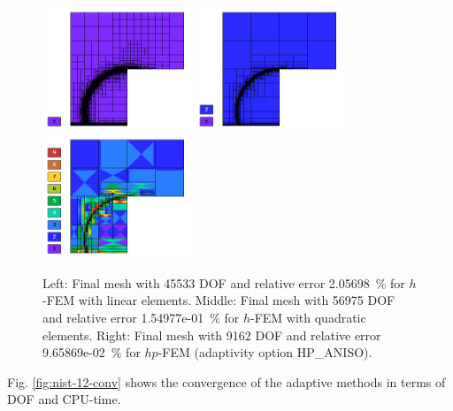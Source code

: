 \documentclass[12pt]{elsarticle}
\begin{document}
\begin{figure}[H]
\centering
\vspace{-3mm}
\includegraphics[height=3.7cm]{nist/nist-12/mesh_h1_aniso.png}
\includegraphics[height=3.7cm]{nist/nist-12/mesh_h2_aniso.png}
\includegraphics[height=3.7cm]{nist/nist-12/mesh_hp_aniso.png}
\vspace{-3mm}
\caption{
Left: Final mesh with 45533 DOF and relative error 2.05698~\% for $h$-FEM with linear elements.
Middle: Final mesh with 56975 DOF and relative error 1.54977e-01~\% for $h$-FEM with quadratic elements.
Right: Final mesh with 9162 DOF and relative error 9.65869e-02~\% for $hp$-FEM (adaptivity option HP\_ANISO).}
\vspace{-3mm}
\label{fig:nist-12-hp-aniso}
\end{figure}

Fig. \ref{fig:nist-12-conv} shows the convergence of the adaptive methods in terms of DOF and CPU-time.
\end{document}

